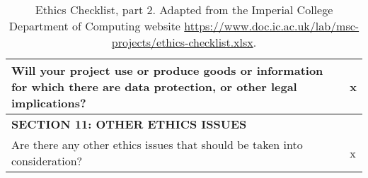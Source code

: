 \documentclass[a4paper,11pt,titlepage]{article}
\begin{document}
\begin{table}[h!]
\begin{tabular}{|p{12.3cm}|l | l |}
        Will your project use or produce goods or information for 
        which there are data protection, or other legal implications? &  & x 				  \\ \hline
        \cellcolor{green!20}\textbf{SECTION 11: OTHER ETHICS ISSUES} &  &  			  \\ \hline
        Are there any other ethics issues that should be taken into consideration? &  & x 	  \\ \hline
    \end{tabular}
    \caption{Ethics Checklist, part 2. Adapted from the Imperial College Department of Computing website \url{https://www.doc.ic.ac.uk/lab/msc-projects/ethics-checklist.xlsx}.}
    \label{tab:ethical_checklist}
\end{table}
\end{document}
